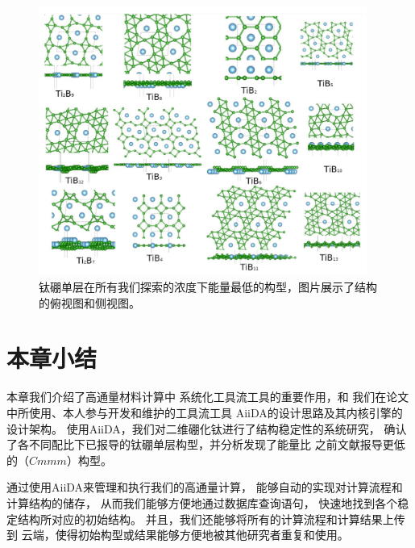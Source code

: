 \begin{figure}[H]
  \includegraphics[width=0.96\textwidth]{figs/ch5_all_configs.png}
  \centering
  \caption{钛硼单层在所有我们探索的浓度下能量最低的构型，图片展示了结构的俯视图和侧视图。}
  \label{fig:ch5_all_configs}
\end{figure}

\section{本章小结}

本章我们介绍了高通量材料计算中
系统化工具流工具的重要作用，和
我们在论文中所使用、本人参与开发和维护的工具流工具
AiiDA的设计思路及其内核引擎的设计架构。
使用AiiDA，我们对二维硼化钛进行了结构稳定性的系统研究，
确认了各不同配比下已报导的钛硼单层构型，并分析发现了能量比
之前文献报导更低的（$Cmmm$）构型。

通过使用AiiDA来管理和执行我们的高通量计算，
能够自动的实现对计算流程和计算结构的储存，
从而我们能够方便地通过数据库查询语句，
快速地找到各个稳定结构所对应的初始结构。
并且，我们还能够将所有的计算流程和计算结果上传到
云端，使得初始构型或结果能够方便地被其他研究者重复和使用。